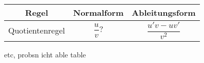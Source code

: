 \documentclass{article}
\begin{document}
 
\noindent
\begin{center}
\begin{tabular}{ |c|c|c| }
\hline
 Regel & Normalform & Ableitungsform \\
\hline
 Quotientenregel & $\dfrac{u}{v}$? & $\dfrac{u'v-uv'}{v^2}$ \\
\hline
\end{tabular}
\end{center}
etc, probsn icht able table 
 
\end{document}
